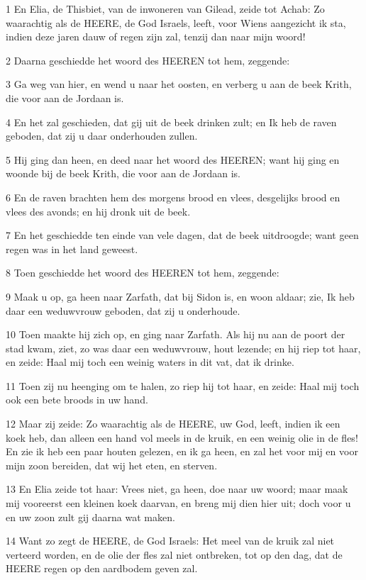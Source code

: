 \par 1 En Elia, de Thisbiet, van de inwoneren van Gilead, zeide tot Achab: Zo waarachtig als de HEERE, de God Israels, leeft, voor Wiens aangezicht ik sta, indien deze jaren dauw of regen zijn zal, tenzij dan naar mijn woord!
\par 2 Daarna geschiedde het woord des HEEREN tot hem, zeggende:
\par 3 Ga weg van hier, en wend u naar het oosten, en verberg u aan de beek Krith, die voor aan de Jordaan is.
\par 4 En het zal geschieden, dat gij uit de beek drinken zult; en Ik heb de raven geboden, dat zij u daar onderhouden zullen.
\par 5 Hij ging dan heen, en deed naar het woord des HEEREN; want hij ging en woonde bij de beek Krith, die voor aan de Jordaan is.
\par 6 En de raven brachten hem des morgens brood en vlees, desgelijks brood en vlees des avonds; en hij dronk uit de beek.
\par 7 En het geschiedde ten einde van vele dagen, dat de beek uitdroogde; want geen regen was in het land geweest.
\par 8 Toen geschiedde het woord des HEEREN tot hem, zeggende:
\par 9 Maak u op, ga heen naar Zarfath, dat bij Sidon is, en woon aldaar; zie, Ik heb daar een weduwvrouw geboden, dat zij u onderhoude.
\par 10 Toen maakte hij zich op, en ging naar Zarfath. Als hij nu aan de poort der stad kwam, ziet, zo was daar een weduwvrouw, hout lezende; en hij riep tot haar, en zeide: Haal mij toch een weinig waters in dit vat, dat ik drinke.
\par 11 Toen zij nu heenging om te halen, zo riep hij tot haar, en zeide: Haal mij toch ook een bete broods in uw hand.
\par 12 Maar zij zeide: Zo waarachtig als de HEERE, uw God, leeft, indien ik een koek heb, dan alleen een hand vol meels in de kruik, en een weinig olie in de fles! En zie ik heb een paar houten gelezen, en ik ga heen, en zal het voor mij en voor mijn zoon bereiden, dat wij het eten, en sterven.
\par 13 En Elia zeide tot haar: Vrees niet, ga heen, doe naar uw woord; maar maak mij vooreerst een kleinen koek daarvan, en breng mij dien hier uit; doch voor u en uw zoon zult gij daarna wat maken.
\par 14 Want zo zegt de HEERE, de God Israels: Het meel van de kruik zal niet verteerd worden, en de olie der fles zal niet ontbreken, tot op den dag, dat de HEERE regen op den aardbodem geven zal.
